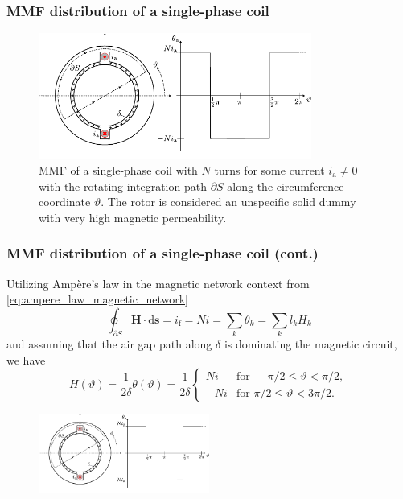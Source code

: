 \begin{frame}
	\frametitle{MMF distribution of a single-phase coil}
    \begin{figure}
            \centering
            \includegraphics[width=0.8\textwidth]{fig/lec05/MMF_single_phase.pdf}
            \caption{MMF of a single-phase coil with $N$ turns for some current $i_\mathrm{a} \neq 0$ with the rotating integration path $\partial S$  along the circumference coordinate $\vartheta$. The rotor is considered an unspecific solid dummy with very high magnetic permeability.}
            \label{fig: MMF_single_phase}
    \end{figure}
\end{frame}

\begin{frame}
	\frametitle{MMF distribution of a single-phase coil (cont.)}
			Utilizing Amp\`ere's law in the magnetic network context from \eqref{eq:ampere_law_magnetic_network}
            $$ \oint_{\partial S} \bm{H} \cdot \mathrm{d}\bm{s} = i_{\mathrm{f}} = N i = \sum_k  \theta_k = \sum_k l_k H_k $$
            and assuming that the air gap path along $\delta$ is dominating the magnetic circuit, we have
            \begin{equation}
                H(\vartheta) = \frac{1}{2\delta} \theta(\vartheta) = \frac{1}{2\delta} \begin{cases}
                    N i & \text{for } -\pi/2 \leq \vartheta < \pi/2, \\
                    -N i & \text{for } \pi/2 \leq \vartheta < 3\pi/2.
                \end{cases}
            \end{equation}
            \begin{figure}
                \centering
                \includegraphics[width=0.5\textwidth]{fig/lec05/MMF_single_phase.pdf}
            \end{figure}
\end{frame}

